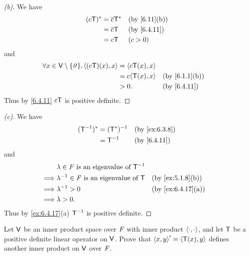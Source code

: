 \begin{proof}[(b)]
  We have
  \begin{align*}
    (c\T)^* & = \conj{c} \T^* &  & \by{6.11}[b] \\
            & = \conj{c} \T   &  & \by{6.4.11}  \\
            & = c \T          &  & (c > 0)
  \end{align*}
  and
  \begin{align*}
    \forall x \in \V \setminus \set{\zv}, \inn{(c \T)(x), x} & = \inn{c \T(x), x}                    \\
                                                             & = c \inn{\T(x), x} &  & \by{6.1.1}[b] \\
                                                             & > 0.               &  & \by{6.4.11}
  \end{align*}
  Thus by \cref{6.4.11} \(c \mathsf{T}\) is positive definite.
\end{proof}

\begin{proof}[(c)]
  We have
  \begin{align*}
    (\T^{-1})^* & = (\T^*)^{-1} &  & \by{ex:6.3.8} \\
                & = \T^{-1}     &  & \by{6.4.11}
  \end{align*}
  and
  \begin{align*}
             & \lambda \in \F \text{ is an eigenvalue of } \T^{-1}                        \\
    \implies & \lambda^{-1} \in \F \text{ is an eigenvalue of } \T &  & \by{ex:5.1.8}[b]  \\
    \implies & \lambda^{-1} > 0                                    &  & \by{ex:6.4.17}[a] \\
    \implies & \lambda > 0.
  \end{align*}
  Thus by \cref{ex:6.4.17}(a) \(\mathsf{T}^{-1}\) is positive definite.
\end{proof}

\begin{ex}\label{ex:6.4.20}
  Let \(\mathsf{V}\) be an inner product space over \(\mathit{F}\) with inner product \(\left\langle\cdot, \cdot\right\rangle\), and let \(\mathsf{T}\) be a positive definite linear operator on \(\mathsf{V}\).
  Prove that \(\left\langle x, y\right\rangle' = \left\langle\mathsf{T}(x), y\right\rangle\) defines another inner product on \(\mathsf{V}\) over \(\mathit{F}\).
\end{ex}

